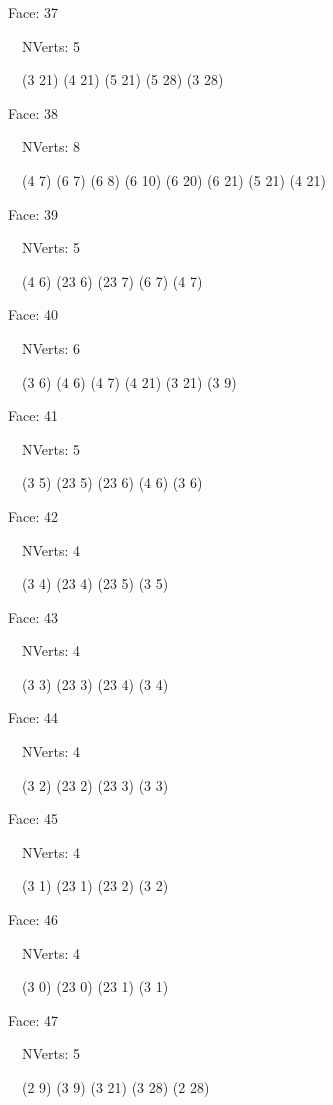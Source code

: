 \documentclass{article}
\begin{document}
{\footnotesize 

Face: 37

\   \    NVerts: 5

 \   \   (3 21) (4 21) (5 21) (5 28) (3 28)}

{\footnotesize 

Face: 38

\   \    NVerts: 8

 \   \   (4 7) (6 7) (6 8) (6 10) (6 20) (6 21) (5 21) (4 21)}

{\footnotesize 

Face: 39

\   \    NVerts: 5

 \   \   (4 6) (23 6) (23 7) (6 7) (4 7)}

{\footnotesize 

Face: 40

\   \    NVerts: 6

 \   \   (3 6) (4 6) (4 7) (4 21) (3 21) (3 9)}

{\footnotesize 

Face: 41

\   \    NVerts: 5

 \   \   (3 5) (23 5) (23 6) (4 6) (3 6)}

{\footnotesize 

Face: 42

\   \    NVerts: 4

 \   \   (3 4) (23 4) (23 5) (3 5)}

{\footnotesize 

Face: 43

\   \    NVerts: 4

 \   \   (3 3) (23 3) (23 4) (3 4)}

{\footnotesize 

Face: 44

\   \    NVerts: 4

 \   \   (3 2) (23 2) (23 3) (3 3)}

{\footnotesize 

Face: 45

\   \    NVerts: 4

 \   \   (3 1) (23 1) (23 2) (3 2)}

{\footnotesize 

Face: 46

\   \    NVerts: 4

 \   \   (3 0) (23 0) (23 1) (3 1)}

{\footnotesize 

Face: 47

\   \    NVerts: 5

 \   \   (2 9) (3 9) (3 21) (3 28) (2 28)}
\end{document}
